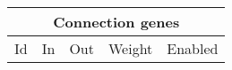 \setlength{\arrayrulewidth}{1mm}
\setlength{\tabcolsep}{5pt}
\renewcommand{\arraystretch}{1}



\begin{tabular}{ |p{0.5cm}|p{0.5cm}|p{0.7cm}|p{1.5cm}|p{1.5cm}|  }
    \hline
    \multicolumn{5}{|c|}{Connection genes} \\

    \hline
    Id & In & Out & Weight & Enabled \\

    \hline

\end{tabular}